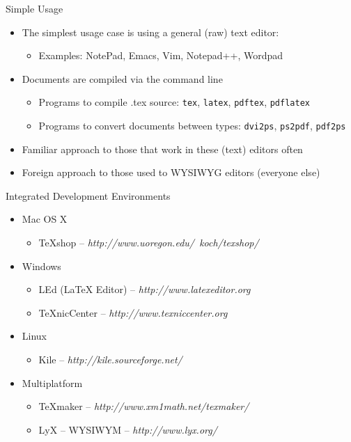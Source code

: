 \documentclass{beamer}
\begin{document}
\begin{frame}{Simple Usage}
  \begin{itemize}
    \item
      The simplest usage case is using a general (raw) text editor:
    \begin{itemize}
      \item Examples: NotePad, Emacs, Vim, Notepad++, Wordpad
    \end{itemize}
    \item
      Documents are compiled via the command line
    \begin{itemize}
      \item Programs to compile .tex source:
        {\tt tex}, {\tt latex}, {\tt pdftex}, {\tt pdflatex}
      \item Programs to convert documents between types:
        {\tt dvi2ps}, {\tt ps2pdf}, {\tt pdf2ps}
    \end{itemize}
    \item
      Familiar approach to those that work in these (text) editors often
    \item
      Foreign approach to those used to WYSIWYG editors (everyone else)
  \end{itemize}
\end{frame}

\begin{frame}{Integrated Development Environments}
    \begin{itemize}
        \item Mac OS X
            \begin{itemize}
                \item \TeX shop -- \emph{http://www.uoregon.edu/~koch/texshop/}
            \end{itemize}
        \item Windows
            \begin{itemize}
                \item LEd (\LaTeX { Editor}) -- \emph{http://www.latexeditor.org}
                \item \TeX nicCenter -- \emph{http://www.texniccenter.org}
            \end{itemize}
        \item Linux
            \begin{itemize}
                \item Kile -- \emph{http://kile.sourceforge.net/}
            \end{itemize}
        \item Multiplatform
            \begin{itemize}
                \item \TeX maker -- \emph{http://www.xm1math.net/texmaker/}
                \item LyX -- WYSIWYM -- \emph{http://www.lyx.org/}
            \end{itemize}
    \end{itemize}
\end{frame}
\end{document}

